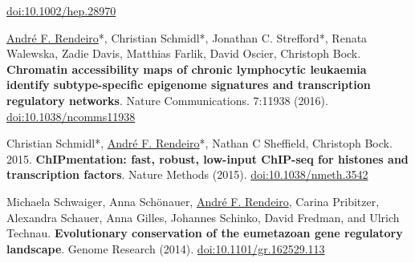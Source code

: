 \documentclass[11pt,a4paper,roman]{moderncv} %
\begin{document}
\begin{etaremune}[leftmargin=1.0cm, itemindent=0pt, topsep=10pt, itemsep=2pt, partopsep=0pt, parsep=0pt]
        \href{https://dx.doi.org/10.1002/hep.28970}{doi:10.1002/hep.28970}
        \item \underline{André F. Rendeiro}*, Christian Schmidl*, Jonathan C. Strefford*, Renata Walewska, Zadie Davis, Matthias Farlik, David Oscier, Christoph Bock. \textbf{Chromatin accessibility maps of chronic lymphocytic leukaemia identify subtype-specific epigenome signatures and transcription regulatory networks}. Nature Communications. 7:11938 (2016).
        \href{https://dx.doi.org/10.1038/ncomms11938}{doi:10.1038/ncomms11938}
        \item Christian Schmidl*, \underline{André F. Rendeiro}*,  Nathan C Sheffield, Christoph Bock. 2015. \textbf{ChIPmentation: fast, robust, low-input ChIP-seq for histones and transcription factors}. Nature Methods (2015).
        \href{https://dx.doi.org/10.1038/nmeth.3542}{doi:10.1038/nmeth.3542}
        \item Michaela Schwaiger, Anna Schönauer, \underline{André F. Rendeiro}, Carina Pribitzer, Alexandra Schauer, Anna Gilles, Johannes Schinko, David Fredman, and Ulrich Technau. \textbf{Evolutionary conservation of the eumetazoan gene regulatory landscape}. Genome Research (2014).
        \href{https://dx.doi.org/10.1101/gr.162529.113}{doi:10.1101/gr.162529.113}
        \end{etaremune}

    
\end{document}
